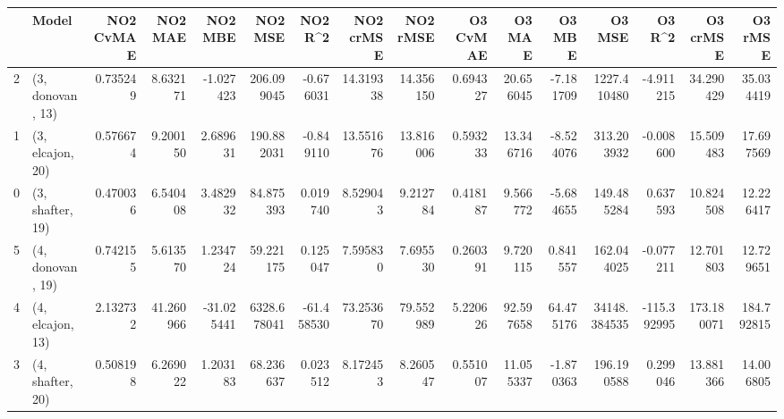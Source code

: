 \begin{tabular}{llrrrrrrrrrrrrrr}
\toprule
{} &             Model &  NO2 CvMAE &    NO2 MAE &    NO2 MBE &      NO2 MSE &    NO2 R\textasciicircum2 &  NO2 crMSE &   NO2 rMSE &  O3 CvMAE &     O3 MAE &     O3 MBE &        O3 MSE &      O3 R\textasciicircum2 &    O3 crMSE &     O3 rMSE \\
\midrule
2 &  (3, donovan, 13) &   0.735249 &   8.632171 &  -1.027423 &   206.099045 &  -0.676031 &  14.319338 &  14.356150 &  0.694327 &  20.656045 &  -7.181709 &   1227.410480 &   -4.911215 &   34.290429 &   35.034419 \\
1 &  (3, elcajon, 20) &   0.576674 &   9.200150 &   2.689631 &   190.882031 &  -0.849110 &  13.551676 &  13.816006 &  0.593233 &  13.346716 &  -8.524076 &    313.203932 &   -0.008600 &   15.509483 &   17.697569 \\
0 &  (3, shafter, 19) &   0.470036 &   6.540408 &   3.482932 &    84.875393 &   0.019740 &   8.529043 &   9.212784 &  0.418187 &   9.566772 &  -5.684655 &    149.485284 &    0.637593 &   10.824508 &   12.226417 \\
5 &  (4, donovan, 19) &   0.742155 &   5.613570 &   1.234724 &    59.221175 &   0.125047 &   7.595830 &   7.695530 &  0.260391 &   9.720115 &   0.841557 &    162.044025 &   -0.077211 &   12.701803 &   12.729651 \\
4 &  (4, elcajon, 13) &   2.132732 &  41.260966 & -31.025441 &  6328.678041 & -61.458530 &  73.253670 &  79.552989 &  5.220626 &  92.597658 &  64.475176 &  34148.384535 & -115.392995 &  173.180071 &  184.792815 \\
3 &  (4, shafter, 20) &   0.508198 &   6.269022 &   1.203183 &    68.236637 &   0.023512 &   8.172453 &   8.260547 &  0.551007 &  11.055337 &  -1.870363 &    196.190588 &    0.299046 &   13.881366 &   14.006805 \\
\bottomrule
\end{tabular}
